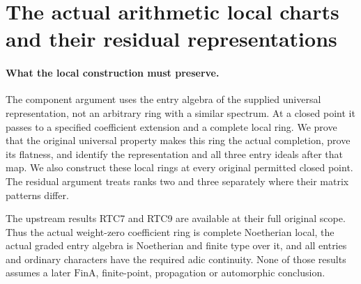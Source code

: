 \section{The actual arithmetic local charts and their residual representations}
\label{sec:arithmetic-local-charts-v055}

\paragraph{What the local construction must preserve.}
The component argument uses the entry algebra of the supplied universal
representation, not an arbitrary ring with a similar spectrum.  At a
closed point it passes to a specified coefficient extension and a
complete local ring.  We prove that the original universal property
makes this ring the actual completion, prove its flatness, and identify
the representation and all three entry ideals after that map.  We also
construct these local rings at every original permitted closed point.
The residual argument treats ranks two and three separately where
their matrix patterns differ.

The upstream results RTC7 and RTC9 are available at their full original
scope.  Thus the actual weight-zero coefficient ring is complete
Noetherian local, the actual graded entry algebra is Noetherian and
finite type over it, and all entries and ordinary characters have the
required adic continuity.  None of those results assumes a later
\(\mathrm{FinA}\), finite-point, propagation or automorphic conclusion.

